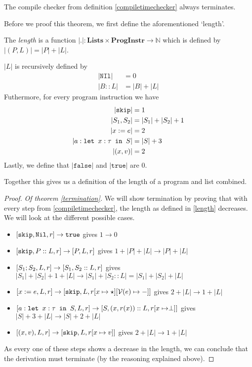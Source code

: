 \begin{theorem}
\label{termination}
The compile checker from definition \ref{compiletimechecker} always terminates.
\end{theorem}

Before we proof this theorem, we first define the aforementioned `length'. 

\begin{definition}
\label{length}
The \emph{length} is a function $|.|: \textbf{Lists} \times \textbf{ProgInstr} \to \mathbb{N}$ which is defined by $|(P,L)| = |P|+|L|$.

$|L|$ is recursively defined by 
\begin{align*}
|\texttt{NIl}| & = 0\\
|B::L| & = |B| + |L|
\end{align*}
Futhermore, for every program instruction we have
\begin{align*}
|\texttt{skip}| & = 1\\
|S_1, S_2| & = |S_1| + |S_2| + 1 \\
|x:=e| & = 2\\
|a : \texttt{let }x : \tau \texttt{ in } S| & = |S| + 3 \\
|(x,v)| & = 2 \\
\end{align*}
Lastly, we define that $|\texttt{false}|$ and $|\texttt{true}|$ are 0.

Together this gives us a definition of the length of a program and list combined.
\end{definition}

\begin{proof}
\emph{Of theorem \ref{termination}.}
We will show termination by proving that with every step from \ref{compiletimechecker}, the length as defined in \ref{length} decreases. We will look at the different possible cases.

\begin{itemize}
    \item $[ \texttt{skip}, \texttt{Nil}, r ] \to \texttt{true}$ gives $1 \to 0$
    \item $[ \texttt{skip}, P::L,  r ] \to [ P, L, r ]$ gives $1 + |P| + |L| \to |P| + |L|$
    \item $[ S_1; S_2, L, r ] \to [ S_1, S_2::L, r ]$ gives $|S_1| + |S_2| + 1 + |L| \to |S_1| + |S_2::L| = |S_1| + |S_2| + |L|$
    \item $[ x:=e, L, r ] \to [ \texttt{skip}, L, r[x\mapsto \star][\mathcal{V}(e) \mapsto -] ]$ gives $2 + |L| \to 1 + |L|$
    \item $[ a : \texttt{let }x : \tau \texttt{ in } S, L, r ] \to [ S, (x,r(x))::L, r[x\mapsto \perp] ]$ gives $|S|+3+|L|\to |S|+2+|L|$
    \item $[ (x,v), L, r ] \to [ \texttt{skip}, L, r[x \mapsto v] ]$ gives $2 + |L| \to 1 + |L|$
\end{itemize}
As every one of these steps shows a decrease in the length, we can conclude that the derivation must terminate (by the reasoning explained above).
\end{proof}

